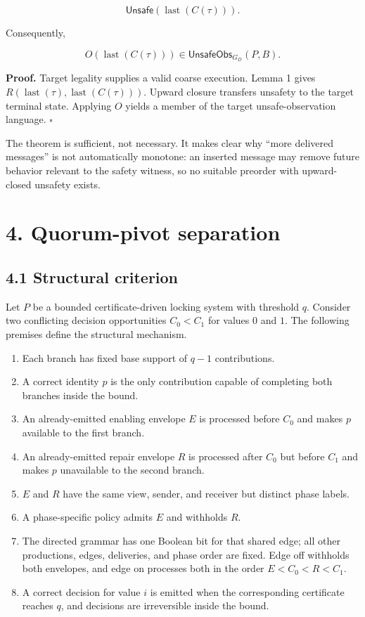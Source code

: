 \[
\mathsf{Unsafe}(\operatorname{last}(C(\tau))).
\]

Consequently,

\[
O(\operatorname{last}(C(\tau)))
\in \mathsf{UnsafeObs}_{G_D}(P,B).
\]

\textbf{Proof.} Target legality supplies a valid coarse execution. Lemma
1 gives \(R(\operatorname{last}(\tau),\operatorname{last}(C(\tau)))\).
Upward closure transfers unsafety to the target terminal state. Applying
\(O\) yields a member of the target unsafe-observation language.
\(\square\)

The theorem is sufficient, not necessary. It makes clear why ``more
delivered messages'' is not automatically monotone: an inserted message
may remove future behavior relevant to the safety witness, so no
suitable preorder with upward-closed unsafety exists.

\section{4. Quorum-pivot separation}\label{quorum-pivot-separation}

\subsection{4.1 Structural criterion}\label{structural-criterion}

Let \(P\) be a bounded certificate-driven locking system with threshold
\(q\). Consider two conflicting decision opportunities \(C_0<C_1\) for
values \(0\) and \(1\). The following premises define the structural
mechanism.

\begin{enumerate}
\def\labelenumi{\arabic{enumi}.}
\tightlist
\item
  Each branch has fixed base support of \(q-1\) contributions.
\item
  A correct identity \(p\) is the only contribution capable of
  completing both branches inside the bound.
\item
  An already-emitted enabling envelope \(E\) is processed before \(C_0\)
  and makes \(p\) available to the first branch.
\item
  An already-emitted repair envelope \(R\) is processed after \(C_0\)
  but before \(C_1\) and makes \(p\) unavailable to the second branch.
\item
  \(E\) and \(R\) have the same view, sender, and receiver but distinct
  phase labels.
\item
  A phase-specific policy admits \(E\) and withholds \(R\).
\item
  The directed grammar has one Boolean bit for that shared edge; all
  other productions, edges, deliveries, and phase order are fixed. Edge
  off withholds both envelopes, and edge on processes both in the order
  \(E<C_0<R<C_1\).
\item
  A correct decision for value \(i\) is emitted when the corresponding
  certificate reaches \(q\), and decisions are irreversible inside the
  bound.
\end{enumerate}

